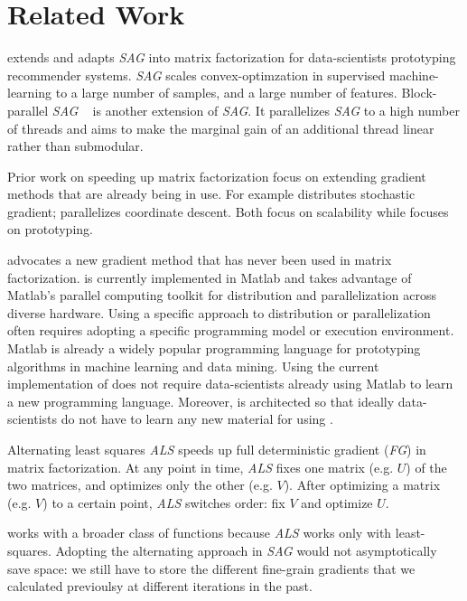 \section{Related Work}
\tool extends and adapts \emph{SAG} into matrix factorization for data-scientists prototyping recommender systems.
\emph{SAG} \cite{schmidt2013minimizing, roux2012stochastic} scales convex-optimzation in supervised machine-learning to a large number of samples, and a large number of features.
Block-parallel \emph{SAG} ~\cite{bpsag} is another extension of \emph{SAG}.
It parallelizes \emph{SAG} to a high number of threads and aims to make the marginal gain of an additional thread linear rather than submodular.


Prior work on speeding up matrix factorization focus on extending gradient methods that are already being in use.
For example \cite{gemulla2011large} distributes stochastic gradient;
\cite{yu2012scalable} parallelizes coordinate descent.
Both focus on scalability while \tool focuses on prototyping.

\tool advocates a new gradient method that has never been used in matrix factorization.  
\tool is currently implemented in Matlab and takes advantage of Matlab's parallel computing toolkit for distribution and parallelization across diverse hardware.
Using a specific approach to distribution or parallelization often requires adopting a specific programming model or execution environment.  
Matlab is already a widely popular programming language for prototyping algorithms in machine learning and data mining.
Using the current implementation of \tool does not require data-scientists already using Matlab to learn a new programming language.
Moreover, \tool is architected so that ideally data-scientists do not have to learn any new material for using \tool.


Alternating least squares \emph{ALS} \cite{koren2009matrix, takacs2012alternating} speeds up full deterministic gradient (\emph{FG}) in matrix factorization.
At any point in time, \emph{ALS} fixes one matrix (e.g. $U$) of the two matrices, and optimizes only the other (e.g. $V$).
After optimizing a matrix (e.g. $V$) to a certain point, \emph{ALS} switches order: fix $V$ and optimize $U$.

\tool works with a broader class of functions because \emph{ALS} works only with least-squares.
Adopting the alternating approach in \emph{SAG} would not asymptotically save space:
we still have to store the different fine-grain gradients that we calculated previoulsy at different iterations in the past.

